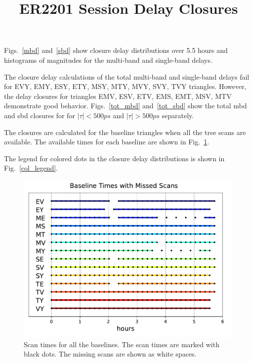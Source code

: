 \documentclass[letterpaper,twoside,12pt]{article}
\title{ER2201 Session Delay Closures}
\begin{document}
\maketitle

Figs.~\ref{mbd} and~\ref{sbd} show closure delay distributions over 5.5 hours and histograms of magnitudes for the multi-band and single-band delays.

The closure delay calculations of the total multi-band and single-band delays fail for EVY, EMY, ESY, ETY, MSY, MTY, MVY, SVY, TVY triangles. However, the delay closures for triangles EMV, ESV, ETV, EMS, EMT, MSV, MTV demonstrate good behavior. Figs.~\ref{tot_mbd} and~\ref{tot_sbd} show the total mbd and sbd closures for for $|\tau| < 500 ps$ and $|\tau| > 500 ps$ separately. 

The closures are calculated for the baseline triangles when all the tree scans are available. The available times for each baseline are shown in Fig.~\ref{time_gaps}.

The legend for colored dots in the closure delay distributions is shown in Fig.~\ref{col_legend}.


\begin{figure}[h!]
  \centering
  \includegraphics[width=30pc]{Gaps_in_Time.pdf}
  \caption{\small Scan times for all the baselines. The scan times are marked with black dots. The missing scans are shown as white spaces. }
  \label{time_gaps}
\end{figure}
\end{document}
